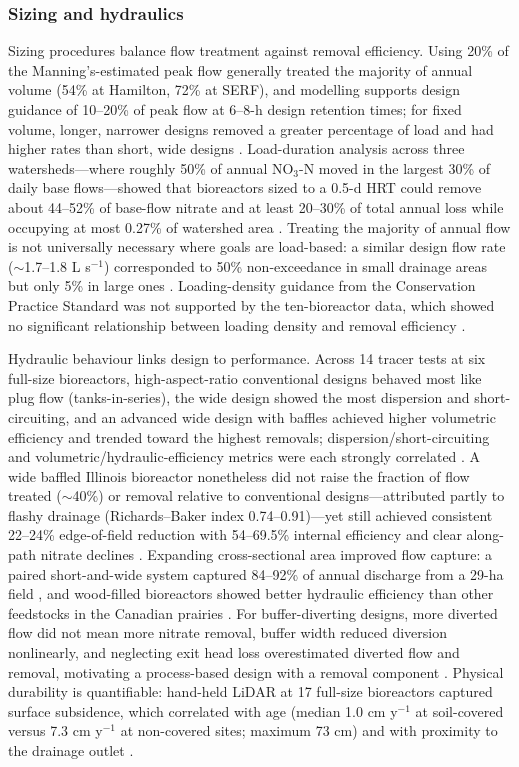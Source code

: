 \documentclass[11pt]{article}
\begin{document}
\subsubsection{Sizing and hydraulics}

Sizing procedures balance flow treatment against removal efficiency. Using 20\% of the Manning's-estimated peak flow generally treated the majority of annual volume (54\% at Hamilton, 72\% at SERF), and modelling supports design guidance of 10--20\% of peak flow at 6--8-h design retention times; for fixed volume, longer, narrower designs removed a greater percentage of load and had higher rates than short, wide designs \parencite{Christianson2013}. Load-duration analysis across three watersheds---where roughly 50\% of annual NO$_3$-N moved in the largest 30\% of daily base flows---showed that bioreactors sized to a 0.5-d HRT could remove about 44--52\% of base-flow nitrate and at least 20--30\% of total annual loss while occupying at most 0.27\% of watershed area \parencite{Moorman2015}. Treating the majority of annual flow is not universally necessary where goals are load-based: a similar design flow rate ($\sim$1.7--1.8 L s$^{-1}$) corresponded to 50\% non-exceedance in small drainage areas but only 5\% in large ones \parencite{Christianson2025}. Loading-density guidance from the Conservation Practice Standard was not supported by the ten-bioreactor data, which showed no significant relationship between loading density and removal efficiency \parencite{Christianson2026}.

Hydraulic behaviour links design to performance. Across 14 tracer tests at six full-size bioreactors, high-aspect-ratio conventional designs behaved most like plug flow (tanks-in-series), the wide design showed the most dispersion and short-circuiting, and an advanced wide design with baffles achieved higher volumetric efficiency and trended toward the highest removals; dispersion/short-circuiting and volumetric/hydraulic-efficiency metrics were each strongly correlated \parencite{deOliveira2023}. A wide baffled Illinois bioreactor nonetheless did not raise the fraction of flow treated ($\sim$40\%) or removal relative to conventional designs---attributed partly to flashy drainage (Richards--Baker index 0.74--0.91)---yet still achieved consistent 22--24\% edge-of-field reduction with 54--69.5\% internal efficiency and clear along-path nitrate declines \parencite{Dougherty2020b}. Expanding cross-sectional area improved flow capture: a paired short-and-wide system captured 84--92\% of annual discharge from a 29-ha field \parencite{Maxwell2022}, and wood-filled bioreactors showed better hydraulic efficiency than other feedstocks in the Canadian prairies \parencite{Kohn2023}. For buffer-diverting designs, more diverted flow did not mean more nitrate removal, buffer width reduced diversion nonlinearly, and neglecting exit head loss overestimated diverted flow and removal, motivating a process-based design with a removal component \parencite{Abdalaal2023}. Physical durability is quantifiable: hand-held LiDAR at 17 full-size bioreactors captured surface subsidence, which correlated with age (median 1.0 cm y$^{-1}$ at soil-covered versus 7.3 cm y$^{-1}$ at non-covered sites; maximum 73 cm) and with proximity to the drainage outlet \parencite{Christianson2025b}.
\end{document}
